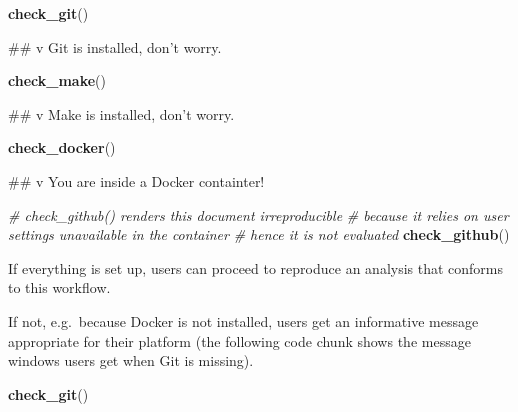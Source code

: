 \documentclass[12pt,a4paper,twoside]{article}
\newenvironment{Shaded}{\begin{snugshade}}{\end{snugshade}}
\newcommand{\CommentTok}[1]{\textcolor[rgb]{0.56,0.35,0.01}{\textit{#1}}}
\newcommand{\KeywordTok}[1]{\textcolor[rgb]{0.13,0.29,0.53}{\textbf{#1}}}
\newcommand{\NormalTok}[1]{#1}
\let\oldverbatim\verbatim
\let\endoldverbatim\endverbatim
\renewenvironment{verbatim}{\footnotesize\oldverbatim}{\endoldverbatim}
\begin{document}
\begin{Shaded}
\begin{Highlighting}[]
\KeywordTok{check_git}\NormalTok{()}
\end{Highlighting}
\end{Shaded}

\begin{verbatim}
## v Git is installed, don't worry.
\end{verbatim}

\begin{Shaded}
\begin{Highlighting}[]
\KeywordTok{check_make}\NormalTok{()}
\end{Highlighting}
\end{Shaded}

\begin{verbatim}
## v Make is installed, don't worry.
\end{verbatim}

\begin{Shaded}
\begin{Highlighting}[]
\KeywordTok{check_docker}\NormalTok{()}
\end{Highlighting}
\end{Shaded}

\begin{verbatim}
## v You are inside a Docker containter!
\end{verbatim}

\begin{Shaded}
\begin{Highlighting}[]
\CommentTok{# check_github() renders this document irreproducible}
\CommentTok{# because it relies on user settings unavailable in the container}
\CommentTok{# hence it is not evaluated}
\KeywordTok{check_github}\NormalTok{()}
\end{Highlighting}
\end{Shaded}

If everything is set up, users can proceed to reproduce an analysis that conforms to this workflow.

If not, e.g.~because Docker is not installed, users get an informative message appropriate for their platform (the following code chunk shows the message windows users get when Git is missing).

\begin{Shaded}
\begin{Highlighting}[]
\KeywordTok{check_git}\NormalTok{()}
\end{Highlighting}
\end{Shaded}
\end{document}
